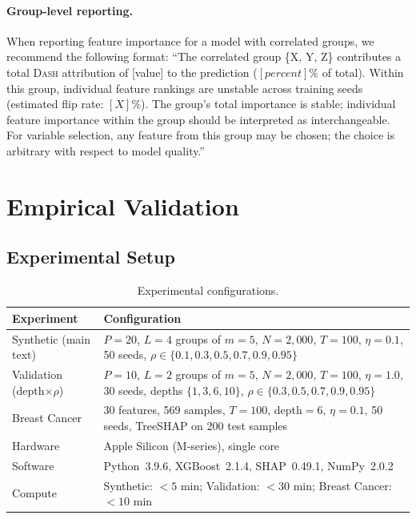 \documentclass{article}
\newcommand{\DASH}{\textsc{Dash}}
\begin{document}
\paragraph{Group-level reporting.}
When reporting feature importance for a model with correlated groups, we recommend the following format:
``The correlated group \{X, Y, Z\} contributes a total \DASH{} attribution of [value] to the prediction ($[percent]\%$ of total). Within this group, individual feature rankings are unstable across training seeds (estimated flip rate: $[X]\%$). The group's total importance is stable; individual feature importance within the group should be interpreted as interchangeable. For variable selection, any feature from this group may be chosen; the choice is arbitrary with respect to model quality.''


\section{Empirical Validation}
\label{sec:experiments}

\subsection{Experimental Setup}

\begin{table}[t]
\centering
\caption{Experimental configurations.}
\small
\begin{tabular}{@{}lp{10cm}@{}}
\toprule
Experiment & Configuration \\
\midrule
Synthetic (main text) & $P{=}20$, $L{=}4$ groups of $m{=}5$, $N{=}2{,}000$, $T{=}100$, $\eta{=}0.1$, 50 seeds, $\rho \in \{0.1, 0.3, 0.5, 0.7, 0.9, 0.95\}$ \\
Validation (depth$\times\rho$) & $P{=}10$, $L{=}2$ groups of $m{=}5$, $N{=}2{,}000$, $T{=}100$, $\eta{=}1.0$, 30 seeds, depths $\{1,3,6,10\}$, $\rho \in \{0.3, 0.5, 0.7, 0.9, 0.95\}$ \\
Breast Cancer & 30 features, 569 samples, $T{=}100$, depth${=}6$, $\eta{=}0.1$, 50 seeds, TreeSHAP on 200 test samples \\
\midrule
Hardware & Apple Silicon (M-series), single core \\
Software & Python~3.9.6, XGBoost~2.1.4, SHAP~0.49.1, NumPy~2.0.2 \\
Compute & Synthetic: ${<}5$ min; Validation: ${<}30$ min; Breast Cancer: ${<}10$ min \\
\bottomrule
\end{tabular}
\end{table}
\end{document}
